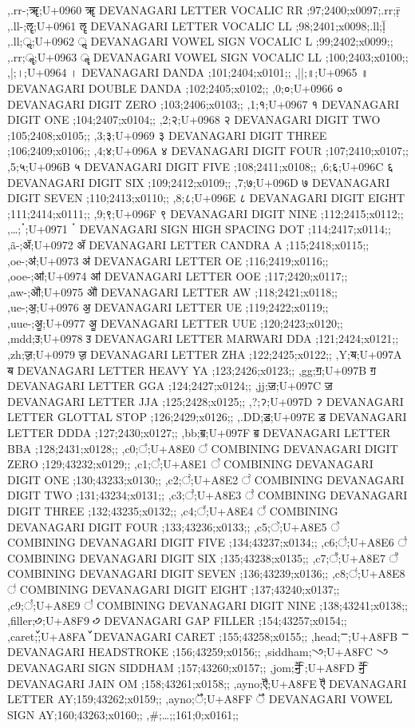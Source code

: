 \documentclass{article}
\begin{document}
{,.rr-;ॠ;U+0960 ॠ DEVANAGARI LETTER VOCALIC RR ;97;2400;x0097;.rr;ṝ 
,.ll-;ॡ;U+0961 ॡ DEVANAGARI LETTER VOCALIC LL ;98;2401;x0098;.ll;ḹ 
,.ll;ॢ;U+0962 ॢ DEVANAGARI VOWEL SIGN VOCALIC L ;99;2402;x0099;;
,.rr;ॣ;U+0963 ॣ DEVANAGARI VOWEL SIGN VOCALIC LL ;100;2403;x0100;;
,|;।;U+0964 । DEVANAGARI DANDA ;101;2404;x0101;;
,||;॥;U+0965 ॥ DEVANAGARI DOUBLE DANDA ;102;2405;x0102;;
,0;०;U+0966 ० DEVANAGARI DIGIT ZERO ;103;2406;x0103;;
,1;१;U+0967 १ DEVANAGARI DIGIT ONE ;104;2407;x0104;;
,2;२;U+0968 २ DEVANAGARI DIGIT TWO ;105;2408;x0105;;
,3;३;U+0969 ३ DEVANAGARI DIGIT THREE ;106;2409;x0106;;
,4;४;U+096A ४ DEVANAGARI DIGIT FOUR ;107;2410;x0107;;
,5;५;U+096B ५ DEVANAGARI DIGIT FIVE ;108;2411;x0108;;
,6;६;U+096C ६ DEVANAGARI DIGIT SIX ;109;2412;x0109;;
,7;७;U+096D ७ DEVANAGARI DIGIT SEVEN ;110;2413;x0110;;
,8;८;U+096E ८ DEVANAGARI DIGIT EIGHT ;111;2414;x0111;;
,9;९;U+096F ९ DEVANAGARI DIGIT NINE ;112;2415;x0112;;
%  
,…;ॱ;U+0971 ॱ DEVANAGARI SIGN HIGH SPACING DOT ;114;2417;x0114;;
,\~a-;ॲ;U+0972 ॲ DEVANAGARI LETTER CANDRA A ;115;2418;x0115;;
,oe-;ॳ;U+0973 ॳ DEVANAGARI LETTER OE ;116;2419;x0116;;
,ooe-;ॴ;U+0974 ॴ DEVANAGARI LETTER OOE ;117;2420;x0117;;
,aw-;ॵ;U+0975 ॵ DEVANAGARI LETTER AW ;118;2421;x0118;;
,ue-;ॶ;U+0976 ॶ DEVANAGARI LETTER UE ;119;2422;x0119;;
,uue-;ॷ;U+0977 ॷ DEVANAGARI LETTER UUE ;120;2423;x0120;;
,mdd;ॸ;U+0978 ॸ DEVANAGARI LETTER MARWARI DDA ;121;2424;x0121;;
,zh;ॹ;U+0979 ॹ DEVANAGARI LETTER ZHA ;122;2425;x0122;;
,Y;ॺ;U+097A ॺ DEVANAGARI LETTER HEAVY YA ;123;2426;x0123;;
,gg;ॻ;U+097B ॻ DEVANAGARI LETTER GGA ;124;2427;x0124;;
,jj;ॼ;U+097C ॼ DEVANAGARI LETTER JJA ;125;2428;x0125;;
,?;ॽ;U+097D ॽ DEVANAGARI LETTER GLOTTAL STOP ;126;2429;x0126;;
,.DD;ॾ;U+097E ॾ DEVANAGARI LETTER DDDA ;127;2430;x0127;;
,bb;ॿ;U+097F ॿ DEVANAGARI LETTER BBA ;128;2431;x0128;;
,c0;꣠;U+A8E0 ꣠ COMBINING DEVANAGARI DIGIT ZERO ;129;43232;x0129;;
,c1;꣡;U+A8E1 ꣡ COMBINING DEVANAGARI DIGIT ONE ;130;43233;x0130;;
,c2;꣢;U+A8E2 ꣢ COMBINING DEVANAGARI DIGIT TWO ;131;43234;x0131;;
,c3;꣣;U+A8E3 ꣣ COMBINING DEVANAGARI DIGIT THREE ;132;43235;x0132;;
,c4;꣤;U+A8E4 ꣤ COMBINING DEVANAGARI DIGIT FOUR ;133;43236;x0133;;
,c5;꣥;U+A8E5 ꣥ COMBINING DEVANAGARI DIGIT FIVE ;134;43237;x0134;;
,c6;꣦;U+A8E6 ꣦ COMBINING DEVANAGARI DIGIT SIX ;135;43238;x0135;;
,c7;꣧;U+A8E7 ꣧ COMBINING DEVANAGARI DIGIT SEVEN ;136;43239;x0136;;
,c8;꣨;U+A8E8 ꣨ COMBINING DEVANAGARI DIGIT EIGHT ;137;43240;x0137;;
,c9;꣩;U+A8E9 ꣩ COMBINING DEVANAGARI DIGIT NINE ;138;43241;x0138;;
%  
%  
%  
%  
%  
%  
%  
%  
%  
%  
%  
%  
%  
%  
%  
,filler;꣹;U+A8F9 ꣹ DEVANAGARI GAP FILLER ;154;43257;x0154;;
,caret;꣺;U+A8FA ꣺ DEVANAGARI CARET ;155;43258;x0155;;
,head;ꣻ;U+A8FB ꣻ DEVANAGARI HEADSTROKE ;156;43259;x0156;;
,siddham;꣼;U+A8FC ꣼ DEVANAGARI SIGN SIDDHAM ;157;43260;x0157;;
,jom;ꣽ;U+A8FD ꣽ DEVANAGARI JAIN OM ;158;43261;x0158;;
,ayno;ꣾ;U+A8FE ꣾ DEVANAGARI LETTER AY;159;43262;x0159;;
,ayno;ꣿ;U+A8FF ꣿ DEVANAGARI VOWEL SIGN AY;160;43263;x0160;;
,\#;…;;161;0;x0161;;
}
\end{document}
